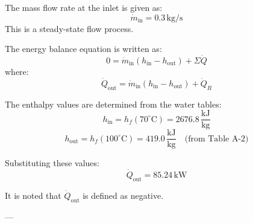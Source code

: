The mass flow rate at the inlet is given as:  
\[
\dot{m}_{\text{in}} = 0.3 \, \text{kg/s}
\]  
This is a steady-state flow process.  

The energy balance equation is written as:  
\[
0 = \dot{m}_{\text{in}} (h_{\text{in}} - h_{\text{out}}) + \Sigma \dot{Q}
\]  
where:  
\[
\dot{Q}_{\text{out}} = \dot{m}_{\text{in}} (h_{\text{in}} - h_{\text{out}}) + \dot{Q}_R
\]  

The enthalpy values are determined from the water tables:  
\[
h_{\text{in}} = h_f(70^\circ\text{C}) = 2676.8 \, \frac{\text{kJ}}{\text{kg}}
\]  
\[
h_{\text{out}} = h_f(100^\circ\text{C}) = 419.0 \, \frac{\text{kJ}}{\text{kg}} \quad \text{(from Table A-2)}
\]  

Substituting these values:  
\[
\dot{Q}_{\text{out}} = 85.24 \, \text{kW}
\]  

It is noted that \(\dot{Q}_{\text{out}}\) is defined as negative.  

---